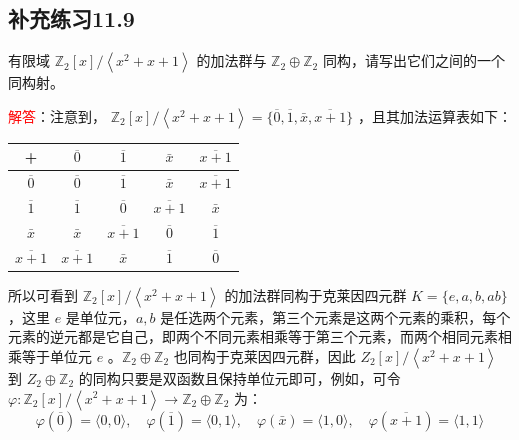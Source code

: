 \documentclass[UTF8, heading=true]{ctexart}
\begin{document}
\subsection{补充练习11.9}

有限域 $\mathbb{Z}_2[x] /\left\langle x^2+x+1\right\rangle$ 的加法群与 $\mathbb{Z}_2 \oplus \mathbb{Z}_2$ 同构，请写出它们之间的一个同构射。

\textcolor{red}{解答}：注意到， $\mathbb{Z}_2[x] /\left\langle x^2+x+1\right\rangle=\{\overline{0}, \overline{1}, \bar{x}, \overline{x+1}\}$ ，且其加法运算表如下：

\vspace{0.5cm}

\begin{table}[H]
  \centering
  \renewcommand{\arraystretch}{1.5}
\begin{tabular}{c||c|c|c|c}
\hline+ & $\overline{0}$ & $\overline{1}$ & $\bar{x}$ & $\overline{x+1}$ \\
\hline$\overline{0}$ & $\overline{0}$ & $\overline{1}$ & $\bar{x}$ & $\overline{x+1}$ \\
$\overline{1}$ & $\overline{1}$ & $\overline{0}$ & $\overline{x+1}$ & $\bar{x}$ \\
$\bar{x}$ & $\bar{x}$ & $\overline{x+1}$ & $\overline{0}$ & $\overline{1}$ \\
$\overline{x+1}$ & $\overline{x+1}$ & $\bar{x}$ & $\overline{1}$ & $\overline{0}$ \\
\hline
\end{tabular}
\end{table}

\vspace{0.5cm}

所以可看到 $\mathbb{Z}_2[x] /\left\langle x^2+x+1\right\rangle$ 的加法群同构于克莱因四元群 $K=\{e, a, b, a b\}$ ，这里 $e$ 是单位元，$a, b$ 是任选两个元素，第三个元素是这两个元素的乘积，每个元素的逆元都是它自己，即两个不同元素相乘等于第三个元素，而两个相同元素相乘等于单位元 $e $ 。$\mathbb{Z}_2 \oplus \mathbb{Z}_2$ 也同构于克莱因四元群，因此 $Z_2[x] /\left\langle x^2+x+1\right\rangle$ 到 $Z_2 \oplus \mathbb{Z}_2$ 的同构只要是双函数且保持单位元即可，例如，可令 $\varphi: \mathbb{Z}_2[x] /\left\langle x^2+x+1\right\rangle \rightarrow \mathbb{Z}_2 \oplus \mathbb{Z}_2$ 为：
$$
\varphi(\overline{0})=\langle 0,0\rangle, \quad \varphi(\overline{1})=\langle 0,1\rangle, \quad \varphi(\bar{x})=\langle 1,0\rangle, \quad \varphi(\overline{x+1})=\langle 1,1\rangle
$$
\end{document}
